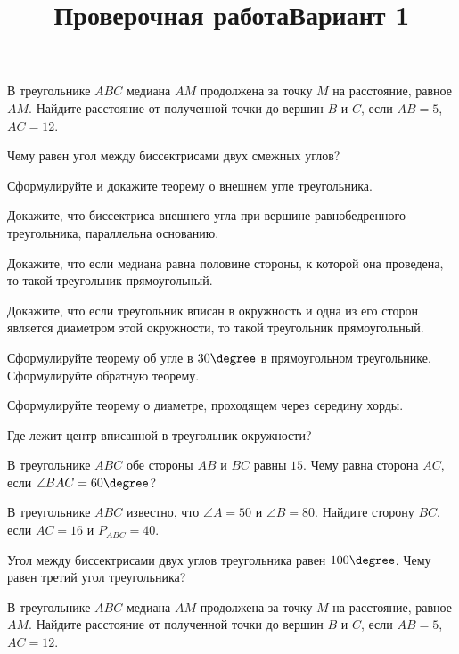 \begin{listofex}
	\item {}
	\item {}
	\item {}
	\item {}
	\item {}
	\item {}
	\item В треугольнике \( ABC \) медиана \( AM \) продолжена за точку \( M \) на расстояние, равное \( AM \). Найдите расстояние от полученной точки до вершин \( B  \) и \( C\), если \( AB = 5\), \( AC = 12\).
	\item {}
	\item {}
\end{listofex}
\newpage
\title{Проверочная работа}
\title{Вариант 1}
\begin{listofex}
	\item
	\begin{enumcols}[itemcolumns=1]
		\item Чему равен угол между биссектрисами двух смежных углов?
		\item Сформулируйте и докажите теорему о внешнем угле треугольника.
		\item Докажите, что биссектриса внешнего угла при вершине равнобедренного треугольника, параллельна основанию.
		\item Докажите, что если медиана равна половине стороны, к которой она проведена, то такой треугольник прямоугольный.
		\item Докажите, что если треугольник вписан в окружность и одна из его сторон является диаметром этой окружности, то такой треугольник прямоугольный.
		\item Сформулируйте теорему об угле в \( 30\degree \) в прямоугольном треугольнике. Сформулируйте обратную теорему.
		\item Сформулируйте теорему о диаметре, проходящем через середину хорды.
		\item Где лежит центр вписанной в треугольник окружности?
	\end{enumcols}
	\item В треугольнике \( ABC \) обе стороны \( AB \) и \( BC \) равны \( 15 \). Чему равна сторона \( AC \), если \( \angle BAC = 60 \degree \)?
	\item В треугольнике \( ABC \) известно, что \( \angle A = 50 \) и \( \angle B = 80 \). Найдите сторону \( BC \), если \( AC = 16 \) и \( P_{ABC}=40 \).
	\item Угол между биссектрисами двух углов треугольника равен \( 100\degree \). Чему равен третий угол треугольника?
	\item {}
	\item {}
	\item В треугольнике \( ABC \) медиана \( AM \) продолжена за точку \( M \) на расстояние, равное \( AM \). Найдите расстояние от полученной точки до вершин \( B  \) и \( C\), если \( AB = 5\), \( AC = 12\).
	\item {}
\end{listofex}
